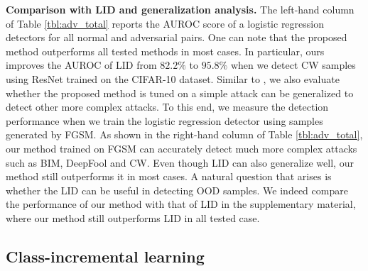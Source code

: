 \documentclass{article}
\begin{document}
{\bf Comparison with LID and generalization analysis.}
The left-hand column of Table \ref{tbl:adv_total} reports the AUROC score of a logistic regression detectors for all normal and adversarial pairs.
One can note that the proposed method outperforms all tested methods in most cases.
In particular, 
ours improves the AUROC of LID from $82.2\%$ to $95.8\%$ when we detect CW samples using ResNet trained on the CIFAR-10 dataset.
Similar to \citep{ma2018characterizing}, 
we also evaluate whether the proposed method is tuned on a simple attack can be generalized to detect other more complex attacks.
To this end, we measure the detection performance when we train the logistic regression detector using samples generated by FGSM.
As shown in the right-hand column of Table \ref{tbl:adv_total},
our method trained on FGSM can accurately detect much more complex attacks such as BIM, DeepFool and CW.
Even though LID can also generalize well, our method still outperforms it in most cases.
A natural question that arises is whether the LID can be useful in detecting OOD samples. We indeed compare the performance of our method with that of LID in the supplementary material, where our method still outperforms LID in all tested case.




\subsection{Class-incremental learning}
\end{document}
